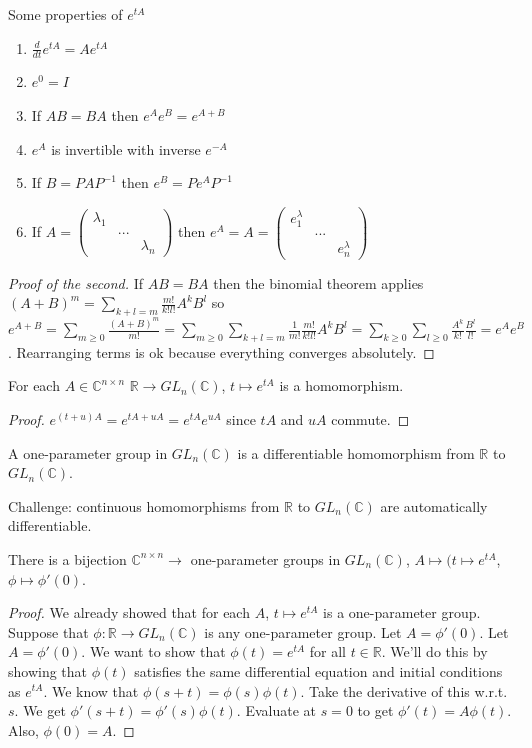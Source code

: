\documentclass{article}
\newcommand{\C}{\mathbb{C}}
\newcommand{\R}{\mathbb{R}}
\newcommand{\ra}[1][]{\xrightarrow{#1}}
\begin{document}
Some properties of $e^{tA}$
\begin{enumerate}
    \item $\frac{d}{dt}e^{tA}=Ae^{tA}$
    \item $e^0=I$
    \item If $AB=BA$ then $e^Ae^B=e^{A+B}$
    \item $e^A$ is invertible with inverse $e^{-A}$
    \item If $B=PAP^{-1}$ then $e^B=Pe^AP^{-1}$
    \item If $A=\begin{pmatrix}
    \lambda_1&&\\&...&\\&&\lambda_n
    \end{pmatrix}$ then $e^A=A=\begin{pmatrix}
    e^\lambda_1&&\\&...&\\&&e^\lambda_n
    \end{pmatrix}$
\end{enumerate}
\begin{proof}[Proof of the second]
If $AB=BA$ then the binomial theorem applies $(A+B)^m=\sum_{k+l=m}\frac{m!}{k!l!}A^kB^l$ so $e^{A+B}=\sum_{m\geq 0}\frac{(A+B)^m}{m!}=\sum_{m\geq 0}\sum_{k+l=m}\frac{1}{m!}\frac{m!}{k!l!}A^kB^l=\sum_{k\geq 0}\sum_{l\geq 0}\frac{A^k}{k!}\frac{B^l}{l!}=e^Ae^B$. Rearranging terms is ok because everything converges absolutely.
\end{proof}
\begin{corollary}
For each $A\in\C^{n\times n}$ $\R\ra GL_n(\C)$, $t\mapsto e^{tA}$ is a homomorphism.
\end{corollary}
\begin{proof}
$e^{(t+u)A}=e^{tA+uA}=e^{tA}e^{uA}$ since $tA$ and $uA$ commute.
\end{proof}
\begin{definition}
A one-parameter group in $GL_n(\C)$ is a differentiable homomorphism from $\R$ to $GL_n(\C)$.
\end{definition}
Challenge: continuous homomorphisms from $\R$ to $GL_n(\C)$ are automatically differentiable.
\begin{proposition}
There is a bijection $\C^{n\times n}\ra $ one-parameter groups in $GL_n(\C)$, $A\mapsto (t\mapsto e^{tA}$, $\phi\mapsto \phi'(0)$.
\end{proposition}
\begin{proof}
We already showed that for each $A$, $t\mapsto e^{tA}$ is a one-parameter group. Suppose that $\phi:\R\ra GL_n(\C)$ is any one-parameter group. Let $A=\phi'(0)$. Let $A=\phi'(0)$. We want to show that $\phi(t)=e^{tA}$ for all $t\in \R$. We'll do this by showing that $\phi(t)$ satisfies the same differential equation and initial conditions as $e^{tA}$. We know that $\phi(s+t)=\phi(s)\phi(t)$. Take the derivative of this w.r.t. $s$. We get $\phi'(s+t)=\phi'(s)\phi(t)$. Evaluate at $s=0$ to get $\phi'(t)=A\phi(t)$. Also, $\phi(0)=A$.
\end{proof}
\end{document}
